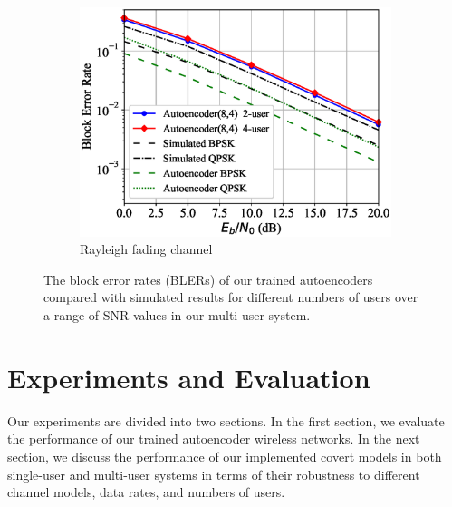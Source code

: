 \begin{figure}[!tp]
\begin{subfigure}{0.28\linewidth}
		\includegraphics[width=\linewidth]{figs/multi_autoencoder_bler_rayleigh}
		\caption{Rayleigh fading channel}	
	\end{subfigure}
	\caption{The block error rates (BLERs) of our trained autoencoders compared with simulated results for different numbers of users over a range of SNR values in our multi-user system.}
	\label{fig:multi_autoencoder_bler}
\end{figure}

\section{Experiments and Evaluation}
\label{s:eval}
Our experiments are divided into two sections. In the first section, we evaluate the performance of our trained autoencoder wireless networks. In the next section, we discuss the performance of our implemented covert models in both single-user and multi-user systems in terms of their robustness to different channel models, data rates, and numbers of users.


